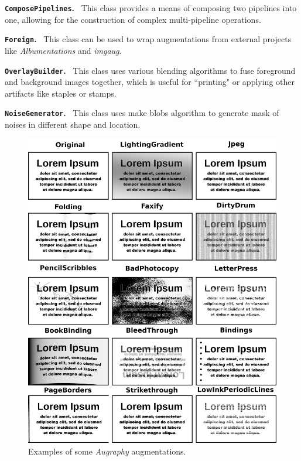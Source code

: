 \documentclass[runningheads]{llncs}
\begin{document}
\noindent\textbf{\texttt{ComposePipelines}.} ~This class provides a means of composing two pipelines into one, allowing for the construction of complex multi-pipeline operations.

\smallskip
\noindent\textbf{\texttt{Foreign}.} ~This class can be used to wrap augmentations from external projects like \emph{Albumentations} and \emph{imgaug}.

\smallskip
\noindent\textbf{\texttt{OverlayBuilder}.} ~This class uses various blending algorithms to fuse foreground and background images together, which is useful for ``printing" or applying other artifacts like staples or stamps.

\smallskip
\noindent\textbf{\texttt{NoiseGenerator}.} ~This class uses make blobs algorithm to generate mask of noises in different shape and location.

\begin{figure}
\includegraphics[width=\textwidth]{figures/augmentation-matrix.png}
\caption{Examples of some \emph{Augraphy} augmentations.} \label{fig2}
\end{figure}
\end{document}
